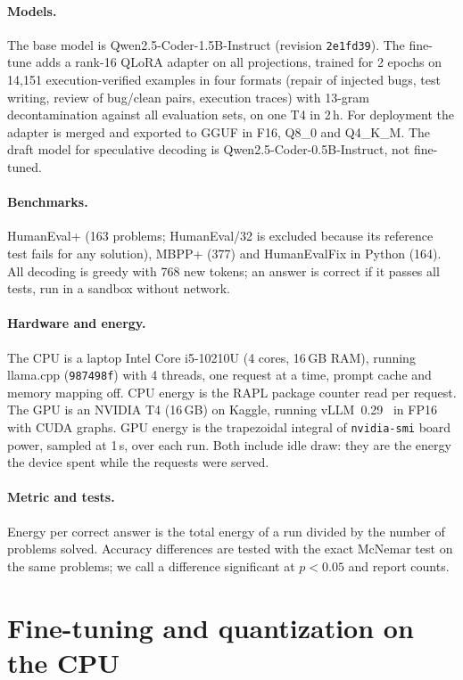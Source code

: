 \documentclass[11pt]{article}
\begin{document}
\paragraph{Models.} The base model is Qwen2.5-Coder-1.5B-Instruct (revision \texttt{2e1fd39}).
The fine-tune adds a rank-16 QLoRA adapter on all projections, trained for 2 epochs on 14{,}151
execution-verified examples in four formats (repair of injected bugs, test writing, review of
bug/clean pairs, execution traces) with 13-gram decontamination against all evaluation sets, on
one T4 in 2\,h. For deployment the adapter is merged and exported to GGUF in F16, Q8\_0 and
Q4\_K\_M. The draft model for speculative decoding is Qwen2.5-Coder-0.5B-Instruct, not
fine-tuned.

\paragraph{Benchmarks.} HumanEval+ (163 problems; HumanEval/32 is excluded because its
reference test fails for any solution), MBPP+ (377) and HumanEvalFix in Python (164).
All decoding is greedy with 768 new tokens; an answer is correct if it passes all tests, run in a
sandbox without network.

\paragraph{Hardware and energy.} The CPU is a laptop Intel Core i5-10210U (4 cores, 16\,GB RAM),
running llama.cpp (\texttt{987498f}) with 4 threads, one request at a time, prompt cache and memory
mapping off. CPU energy is the RAPL package counter read per request. The GPU is an NVIDIA T4
(16\,GB) on Kaggle, running vLLM~0.29~\citep{kwon2023vllm} in FP16 with CUDA graphs. GPU energy
is the trapezoidal integral of \texttt{nvidia-smi} board power, sampled at 1\,s, over each run.
Both include idle draw: they are the energy the device spent while the requests were served.

\paragraph{Metric and tests.} Energy per correct answer is the total energy of a run divided by
the number of problems solved. Accuracy differences are tested with the exact McNemar test on
the same problems; we call a difference significant at $p<0.05$ and report counts.

\section{Fine-tuning and quantization on the CPU}
\label{sec:cpu}
\end{document}
